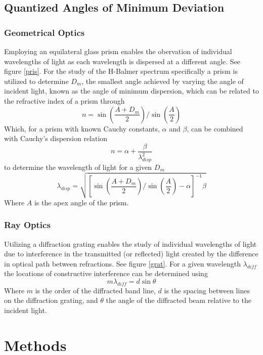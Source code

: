 \documentclass[10pt, twocolumn]{article}
\theoremstyle{definition}
\begin{document}
\subsection{Quantized Angles of Minimum Deviation}
\subsubsection{Geometrical Optics}
Employing an equilateral glass prism enables the obervation of individual wavelengths of light as each wavelength is dispersed at a different angle.
See figure \ref{pris}.
For the study of the H-Balmer spectrum specifically a prism is utilized to determine $D_m$, the smallest
angle achieved by varying the angle of incident light, known as the angle of minimum dispersion,
which can be related to the refractive index of a prism through
\begin{equation}
  n=\sin\left(\frac{A+D_m}{2}\right)/\sin\left(\frac{A}{2}\right)
\end{equation}
Which, for a prism with known Cauchy constants, $\alpha$ and $\beta$, can be combined with Cauchy's dispersion relation
\begin{equation}\label{cauchy}
  n=\alpha+\frac{\beta}{\lambda_{disp}^2}
\end{equation}
to determine the wavelength of light for a given $D_m$
\begin{equation}
  \lambda_{disp}=\sqrt{\left[\sin\left(\frac{A+D_m}{2}\right)/\sin\left(\frac{A}{2}\right)-\alpha\right]^{-1}\beta}
\end{equation}
Where $A$ is the apex angle of the prism.
\subsubsection{Ray Optics}
Utilizing a diffraction grating enables the study of individual wavelengths of light due to interference in the transmitted (or reflected) light
created by the difference in optical path between refractions. See figure \ref{grat}. For a given wavelength $\lambda_{diff}$ the locations of constructive interference can be
determined using
\begin{equation}
  m\lambda_{diff}=d\sin\theta
\end{equation}
Where $m$ is the order of the diffracted band line, $d$ is the spacing between lines on the diffraction grating, and $\theta$ the angle
of the diffracted beam relative to the incident light.
\section{Methods}
\end{document}
